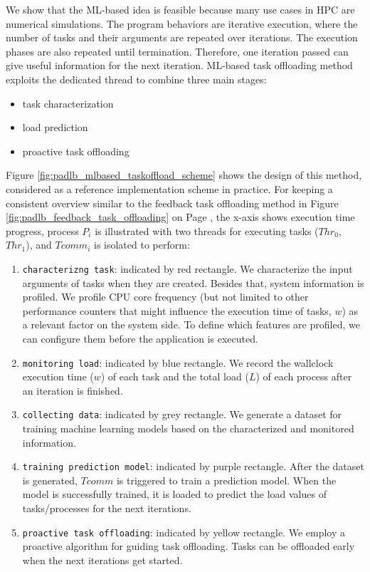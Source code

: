 We show that the ML-based idea is feasible because many use cases in HPC are numerical simulations. The program behaviors are iterative execution, where the number of tasks and their arguments are repeated over iterations. The execution phases are also repeated until termination. Therefore, one iteration passed can give useful information for the next iteration. ML-based task offloading method exploits the dedicated thread to combine three main stages:
\begin{itemize}
	\item task characterization
	\item load prediction
	\item proactive task offloading
\end{itemize}

Figure \ref{fig:padlb_mlbased_taskoffload_scheme} shows the design of this method, considered as a reference implementation scheme in practice. For keeping a consistent overview similar to the feedback task offloading method in Figure \ref{fig:padlb_feedback_task_offloading} on Page \pageref{fig:padlb_feedback_task_offloading}, the x-axis shows execution time progress, process $P_{i}$ is illustrated with two threads for executing tasks ($Thr_{0}$, $Thr_{1}$), and $Tcomm_{i}$ is isolated to perform: 

\begin{enumerate}
	\item \texttt{characterizng task}: indicated by red rectangle. We characterize the input arguments of tasks when they are created. Besides that, system information is profiled. We profile CPU core frequency (but not limited to other performance counters that might influence the execution time of tasks, $w$) as a relevant factor on the system side. To define which features are profiled, we can configure them before the application is executed.
	\item \texttt{monitoring load}: indicated by blue rectangle. We record the wallclock execution time ($w$) of each task and the total load ($L$) of each process after an iteration is finished.
	\item \texttt{collecting data}: indicated by grey rectangle. We generate a dataset for training machine learning models based on the characterized and monitored information.
	\item \texttt{training prediction model}: indicated by purple rectangle. After the dataset is generated, $Tcomm$ is triggered to train a prediction model. When the model is successfully trained, it is loaded to predict the load values of tasks/processes for the next iterations.
	\item \texttt{proactive task offloading}: indicated by yellow rectangle. We employ a proactive algorithm for guiding task offloading. Tasks can be offloaded early when the next iterations get started.
\end{enumerate}

